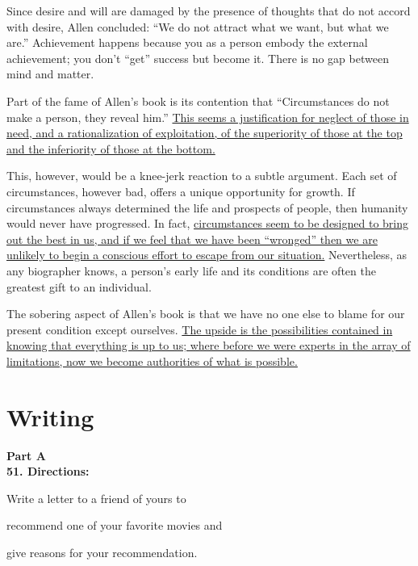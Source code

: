 Since desire and will are damaged by the presence of thoughts that do
not accord with desire, Allen concluded: ``We do not attract what we
want, but what we are.'' Achievement happens because you as a person
embody the external achievement; you don't ``get'' success but become it.
There is no gap between mind and matter.

Part of the fame of Allen's book is its contention that ``Circumstances
do not make a person, they reveal him.'' \transnum \uline{This seems a
	justification for neglect of those in need, and a rationalization of
	exploitation, of the superiority of those at the top and the inferiority
	of those at the bottom.}

This, however, would be a knee-jerk reaction to a subtle argument. Each
set of circumstances, however bad, offers a unique opportunity for
growth. If circumstances always determined the life and prospects of
people, then humanity would never have progressed. In fact,
\transnum \uline{circumstances seem to be designed to bring out the best
	in us, and if we feel that we have been ``wronged'' then we are unlikely
	to begin a conscious effort to escape from our situation.} Nevertheless,
as any biographer knows, a person's early life and its conditions are
often the greatest gift to an individual.

The sobering aspect of Allen's book is that we have no one else to blame
for our present condition except ourselves. \transnum \uline{The upside
	is the possibilities contained in knowing that everything is up to us;
	where before we were experts in the array of limitations, now we become
	authorities of what is possible.}



\newpage

\section{Writing}


\noindent
\textbf{Part A}\\
\textbf{51. Directions:}

Write a letter to a friend of yours to
\begin{listwrite}
	\item
recommend one of your favorite movies and

\item 
 give reasons for your recommendation.
\end{listwrite}


